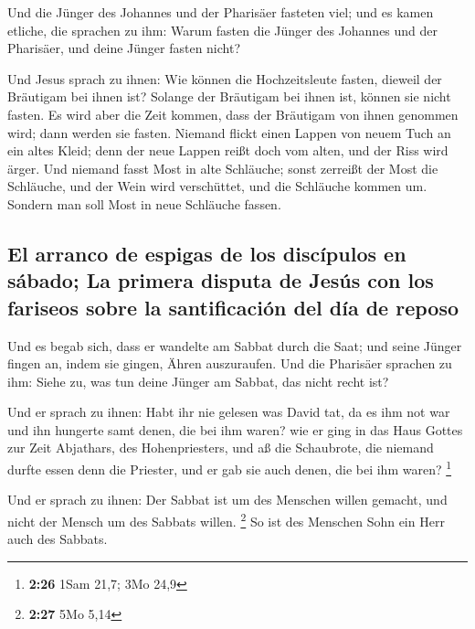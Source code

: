  Und die Jünger des Johannes und der Pharisäer fasteten
viel; und es kamen etliche, die sprachen zu ihm: Warum fasten die Jünger
des Johannes und der Pharisäer, und deine Jünger fasten nicht?

 Und Jesus sprach zu ihnen: Wie können die Hochzeitsleute
fasten, dieweil der Bräutigam bei ihnen ist? Solange der Bräutigam bei
ihnen ist, können sie nicht fasten.  Es wird aber die
Zeit kommen, dass der Bräutigam von ihnen genommen wird; dann werden sie
fasten.  Niemand flickt einen Lappen von neuem Tuch an
ein altes Kleid; denn der neue Lappen reißt doch vom alten, und der Riss
wird ärger.  Und niemand fasst Most in alte Schläuche;
sonst zerreißt der Most die Schläuche, und der Wein wird verschüttet,
und die Schläuche kommen um. Sondern man soll Most in neue Schläuche
fassen.

\hypertarget{el-arranco-de-espigas-de-los-discuxedpulos-en-suxe1bado-la-primera-disputa-de-jesuxfas-con-los-fariseos-sobre-la-santificaciuxf3n-del-duxeda-de-reposo}{%
\subsection{El arranco de espigas de los discípulos en sábado; La
primera disputa de Jesús con los fariseos sobre la santificación del día
de
reposo}\label{el-arranco-de-espigas-de-los-discuxedpulos-en-suxe1bado-la-primera-disputa-de-jesuxfas-con-los-fariseos-sobre-la-santificaciuxf3n-del-duxeda-de-reposo}}

 Und es begab sich, dass er wandelte am Sabbat durch die
Saat; und seine Jünger fingen an, indem sie gingen, Ähren auszuraufen.
 Und die Pharisäer sprachen zu ihm: Siehe zu, was tun
deine Jünger am Sabbat, das nicht recht ist?

 Und er sprach zu ihnen: Habt ihr nie gelesen was David
tat, da es ihm not war und ihn hungerte samt denen, die bei ihm waren?
 wie er ging in das Haus Gottes zur Zeit Abjathars, des
Hohenpriesters, und aß die Schaubrote, die niemand durfte essen denn die
Priester, und er gab sie auch denen, die bei ihm waren? \footnote{\textbf{2:26}
  1Sam 21,7; 3Mo 24,9}

 Und er sprach zu ihnen: Der Sabbat ist um des Menschen
willen gemacht, und nicht der Mensch um des Sabbats willen. \footnote{\textbf{2:27}
  5Mo 5,14}  So ist des Menschen Sohn ein Herr auch des
Sabbats.

